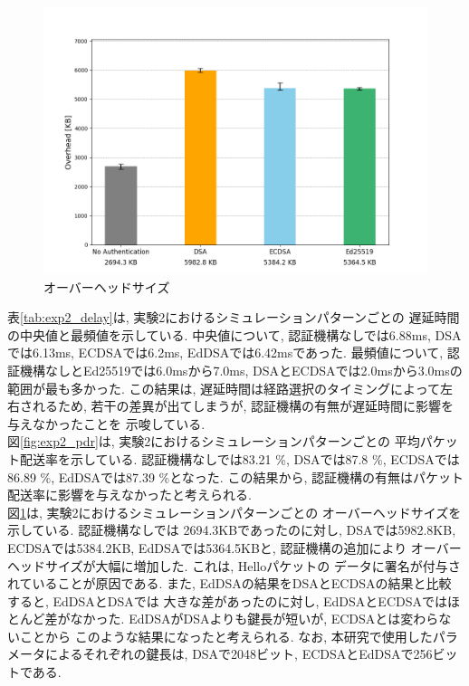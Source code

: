 \begin{figure}
  \centering
  \includegraphics[width=1\textwidth]{figures/exp2_overhead.png}
  \caption{オーバーヘッドサイズ}
  \label{fig:exp2_overhead}
\end{figure}

\indent 表\ref{tab:exp2_delay}は, 実験2におけるシミュレーションパターンごとの
遅延時間の中央値と最頻値を示している. 中央値について, 認証機構なしでは6.88ms, 
DSAでは6.13ms, ECDSAでは6.2ms, EdDSAでは6.42msであった. 
最頻値について, 認証機構なしとEd25519では6.0msから7.0ms, 
DSAとECDSAでは2.0msから3.0msの範囲が最も多かった. 
この結果は, 遅延時間は経路選択のタイミングによって左右されるため, 
若干の差異が出てしまうが, 認証機構の有無が遅延時間に影響を与えなかったことを
示唆している. \\
\indent 図\ref{fig:exp2_pdr}は, 実験2におけるシミュレーションパターンごとの
平均パケット配送率を示している. 認証機構なしでは83.21 \%, DSAでは87.8 \%, 
ECDSAでは86.89 \%, EdDSAでは87.39 \%となった. この結果から, 
認証機構の有無はパケット配送率に影響を与えなかったと考えられる. \\
\indent 図\ref{fig:exp2_overhead}は, 実験2におけるシミュレーションパターンごとの
オーバーヘッドサイズを示している. 認証機構なしでは
2694.3KBであったのに対し, DSAでは5982.8KB, ECDSAでは5384.2KB, 
EdDSAでは5364.5KBと, 認証機構の追加により
オーバーヘッドサイズが大幅に増加した. これは, Helloパケットの
データに署名が付与されていることが原因である. また, 
EdDSAの結果をDSAとECDSAの結果と比較すると, EdDSAとDSAでは
大きな差があったのに対し, EdDSAとECDSAではほとんど差がなかった. 
EdDSAがDSAよりも鍵長が短いが, ECDSAとは変わらないことから
このような結果になったと考えられる. 
なお, 本研究で使用したパラメータによるそれぞれの鍵長は, 
DSAで2048ビット, ECDSAとEdDSAで256ビットである. \\


